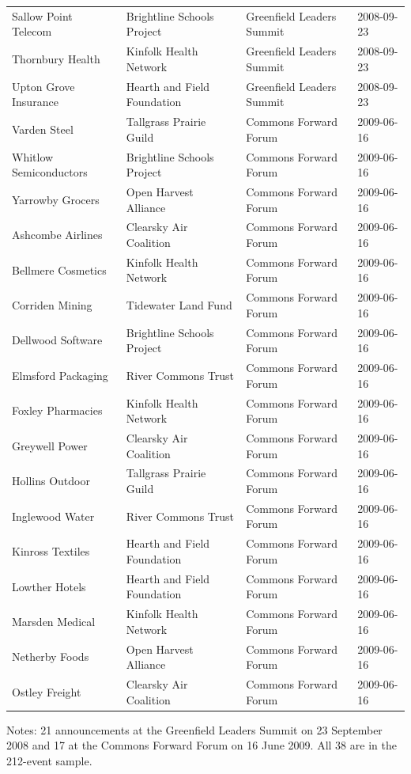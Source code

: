 \documentclass[11pt]{article}
\begin{document}
\begin{table}[h!]
\begin{threeparttable}
\begin{tabular}{llll}
Sallow Point Telecom & Brightline Schools Project & Greenfield Leaders Summit & 2008-09-23 \\
Thornbury Health & Kinfolk Health Network & Greenfield Leaders Summit & 2008-09-23 \\
Upton Grove Insurance & Hearth and Field Foundation & Greenfield Leaders Summit & 2008-09-23 \\
\addlinespace
Varden Steel & Tallgrass Prairie Guild & Commons Forward Forum & 2009-06-16 \\
Whitlow Semiconductors & Brightline Schools Project & Commons Forward Forum & 2009-06-16 \\
Yarrowby Grocers & Open Harvest Alliance & Commons Forward Forum & 2009-06-16 \\
Ashcombe Airlines & Clearsky Air Coalition & Commons Forward Forum & 2009-06-16 \\
Bellmere Cosmetics & Kinfolk Health Network & Commons Forward Forum & 2009-06-16 \\
Corriden Mining & Tidewater Land Fund & Commons Forward Forum & 2009-06-16 \\
Dellwood Software & Brightline Schools Project & Commons Forward Forum & 2009-06-16 \\
Elmsford Packaging & River Commons Trust & Commons Forward Forum & 2009-06-16 \\
Foxley Pharmacies & Kinfolk Health Network & Commons Forward Forum & 2009-06-16 \\
Greywell Power & Clearsky Air Coalition & Commons Forward Forum & 2009-06-16 \\
Hollins Outdoor & Tallgrass Prairie Guild & Commons Forward Forum & 2009-06-16 \\
Inglewood Water & River Commons Trust & Commons Forward Forum & 2009-06-16 \\
Kinross Textiles & Hearth and Field Foundation & Commons Forward Forum & 2009-06-16 \\
Lowther Hotels & Hearth and Field Foundation & Commons Forward Forum & 2009-06-16 \\
Marsden Medical & Kinfolk Health Network & Commons Forward Forum & 2009-06-16 \\
Netherby Foods & Open Harvest Alliance & Commons Forward Forum & 2009-06-16 \\
Ostley Freight & Clearsky Air Coalition & Commons Forward Forum & 2009-06-16 \\
\bottomrule
\end{tabular}
\begin{tablenotes}\footnotesize
\item Notes: 21 announcements at the Greenfield Leaders Summit on 23 September 2008 and 17 at the Commons Forward Forum on 16 June 2009. All 38 are in the 212-event sample.
\end{tablenotes}
\end{threeparttable}
\end{table}
\end{document}
